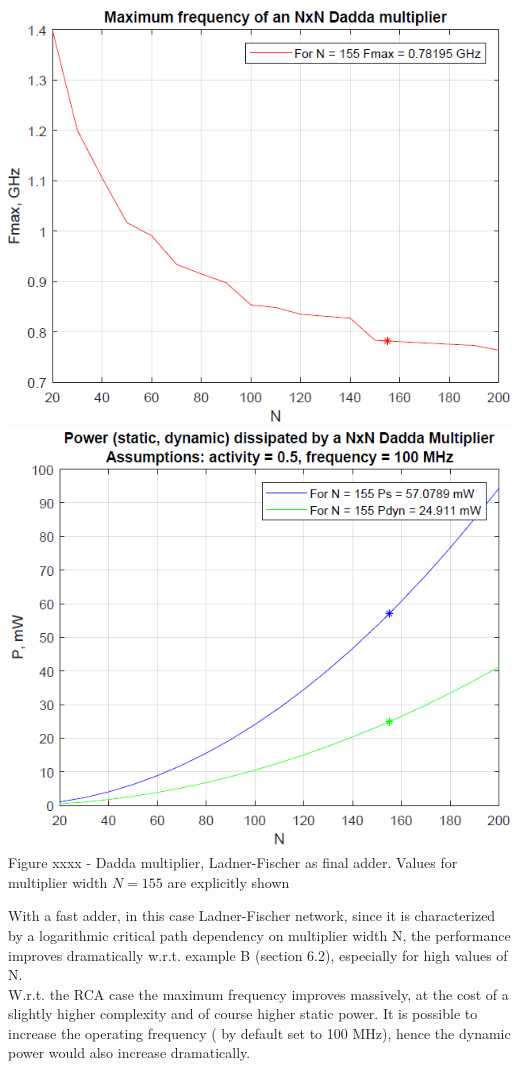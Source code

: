 \documentclass[11pt]{article} %
\begin{document}
\begin{center}
\includegraphics[scale=.48]{fmax_dadda_pp_lf.PNG}
\includegraphics[scale=.48]{power_dadda_pp_lf.PNG}
\small{Figure xxxx - Dadda multiplier, Ladner-Fischer as final adder. Values for multiplier width $N=155$ are explicitly shown}
\end{center}
\vspace{1em}
With a fast adder, in this case Ladner-Fischer network, since it is characterized by a logarithmic critical path dependency on multiplier width N, the performance improves dramatically w.r.t. example B (section 6.2), especially for high values of N.\\
W.r.t. the RCA case the maximum frequency improves massively, at the cost of a slightly higher complexity and of course higher static power. It is possible to increase the operating frequency ( by default set to 100 MHz), hence the dynamic power would also increase dramatically.
\newpage
\end{document}
